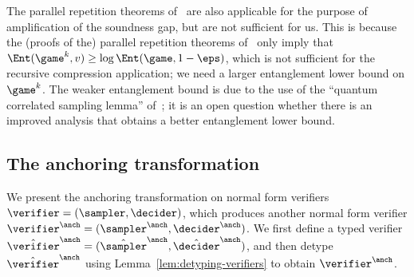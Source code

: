 \begin{remark}
The parallel repetition theorems of~\cite{dinur2015parallel,yuen2016parallel}
are also applicable for the purpose of amplification of the soundness gap, but are not
sufficient for us. This is because the (proofs of the) parallel repetition theorems
of~\cite{dinur2015parallel,yuen2016parallel} only imply that $\Ent(\game^k,v)
\geq \log \Ent(\game,1 - \eps)$, which is not sufficient for the recursive compression application; we need a larger entanglement lower bound 
on $\game^k$.  The weaker entanglement bound is due to the use of the
  ``quantum correlated sampling lemma'' of~\cite{dinur2015parallel}; it is an open question whether there is
  an improved analysis that obtains a better entanglement lower bound.
\end{remark}


\subsection{The anchoring transformation} 
\label{sec:anchoring}

We present the anchoring transformation on normal form verifiers $\verifier = (\sampler,\decider)$,
which produces another normal form verifier $\vanch = (\sanch,\danch)$.
We first define a typed verifier $\tvanch = (\tsanch,
\tdanch)$, and then detype $\tvanch$ using
Lemma~\ref{lem:detyping-verifiers} to obtain $\vanch$.

